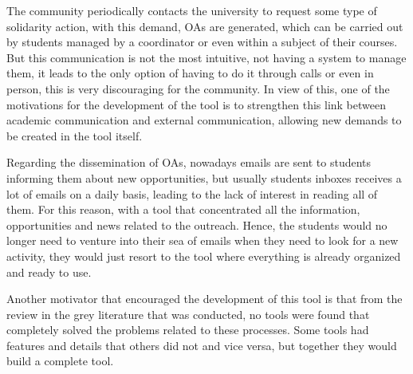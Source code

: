 The community periodically contacts the university to request some type of solidarity action, with this demand, \acp{OA} are generated, which can be carried out by students managed by a coordinator or even within a subject of their courses. 
But this communication is not the most intuitive, not having a system to manage them, it leads to the only option of having to do it through calls or even in person, this is very discouraging for the community. 
In view of this, one of the motivations for the development of the tool is to strengthen this link between academic communication and external communication, allowing new demands to be created in the tool itself.


Regarding the dissemination of \acp{OA}, nowadays emails are sent to students informing them about new opportunities, but usually students inboxes receives a lot of emails on a daily basis, leading to the lack of interest in reading all of them. 
For this reason, with a tool that concentrated all the information, opportunities and news related to the outreach.
Hence, the students would no longer need to venture into their sea of emails when they need to look for a new activity, they would just resort to the tool where everything is already organized and ready to use.


Another motivator that encouraged the development of this tool is that from the review in the grey literature that was conducted, no tools were found that completely solved the problems related to these processes. Some tools had features and details that others did not and vice versa, but together they would build a complete tool.

